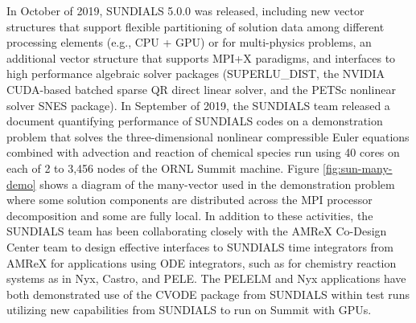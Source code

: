 In October of 2019, SUNDIALS 5.0.0 was released, including new vector structures that support flexible partitioning of solution data among different processing elements (e.g., CPU + GPU) or for multi-physics problems, an additional vector structure that supports MPI+X paradigms, and interfaces 
to high performance algebraic solver packages (SUPERLU\_DIST, the NVIDIA CUDA-based 
batched sparse QR direct linear solver, and the PETSc nonlinear solver SNES package).
In September of 2019, the SUNDIALS team released a document quantifying performance of SUNDIALS codes on 
a demonstration problem that solves the three-dimensional nonlinear compressible Euler equations combined with advection and reaction of chemical species run using 40 cores on each of 2 to 3,456 nodes of the ORNL Summit machine.
Figure \ref{fig:sun-many-demo} shows a diagram of the many-vector used in the demonstration problem where some solution components are distributed across the MPI processor decomposition and some are fully local.
In addition to these activities, the SUNDIALS team has been collaborating closely with the AMReX Co-Design Center team to 
design effective interfaces to SUNDIALS time integrators from AMReX for applications using ODE integrators,
such as for chemistry reaction systems as in Nyx, Castro, and PELE.  The PELELM and Nyx applications have both demonstrated use of the CVODE package from SUNDIALS within test runs utilizing new capabilities from SUNDIALS to run on Summit with GPUs.



